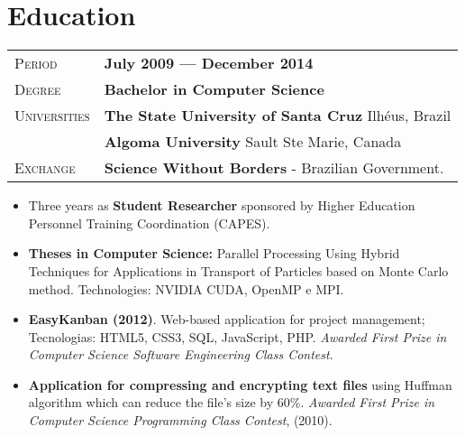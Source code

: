 \documentclass[10pt, a4paper, oneside, final]{scrartcl} %
\newcommand{\gray}{\rowcolor[gray]{.90}} %
\begin{document}


\section{Education}

\begin{center}
\begin{tabularx}{1.0\linewidth}{>{\raggedleft\scshape}p{2.34cm}X}
\gray Period & \textbf{July 2009 --- December 2014}\\
\gray Degree & \textbf{Bachelor in Computer Science}\\
\gray Universities & \textbf{The State University of Santa Cruz} \hfill Ilhéus, Brazil\\ 
\gray & \textbf{Algoma University} \hfill Sault Ste Marie, Canada\\
\gray Exchange & \textbf{Science Without Borders} - Brazilian Government.
\end{tabularx}
\end{center}

\begin{itemize}\itemsep1.5pt

\item Three years as \textbf{Student Researcher} sponsored by Higher Education Personnel Training Coordination (CAPES).

\item \textbf{Theses in Computer Science:} Parallel Processing Using Hybrid Techniques for Applications in Transport of Particles based on Monte Carlo method. Technologies: NVIDIA CUDA, OpenMP e MPI.
   
\item \textbf{EasyKanban (2012)}. Web-based application for project management; Tecnologias: HTML5, CSS3, SQL, JavaScript, PHP. \textit{Awarded First Prize in Computer Science Software Engineering Class Contest}.
  
\item \textbf{Application for compressing and encrypting text files} using Huffman algorithm which can reduce the file's size by 60\%. \textit{Awarded First Prize in Computer Science Programming Class Contest}, (2010). 
  
\end{itemize}
\end{document}
